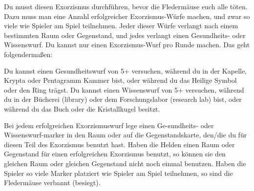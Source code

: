 





Du musst diesen Exorzismus durchführen, bevor die Fledermäuse euch alle töten. Dazu muss man eine Anzahl erfolgreicher Exorzismus-Würfe machen, und zwar so viele wie Spieler am Spiel teilnehmen. Jeder dieser Würfe verlangt nach einem bestimmten Raum oder Gegenstand, und jedes verlangt einen Gesundheits- oder Wissenswurf.
Du kannst nur einen Exorzismus-Wurf pro Runde machen. Das geht folgendermaßen:

  \begin{itemize}
    \bitem Du kannst einen Gesundheitswurf von 5+ versuchen, während du in der Kapelle, Krypta oder Pentagramm Kammer bist, oder während du das Heilige Symbol oder den Ring trägst.
    \bitem Du kannst einen Wissenswurf von 5+ versuchen, während du in der Bücherei (library) oder dem Forschungslabor (research lab) bist, oder während du das Buch oder die Kristallkugel besitzt.
    \end{itemize}

\newpage Bei jedem erfolgreichen Exorzismuswurf lege einen Ge-sundheits- oder Wissenswurf-marker in den Raum oder auf die Gegenstandskarte, den/die du für diesen Teil des Exorzismus benutzt hast.
Haben die Helden einen Raum oder Gegenstand für einen erfolgreichen Exorzismus benutzt, so können sie den gleichen Raum oder gleichen Gegenstand nicht noch einmal benutzen.
Haben die Spieler so viele Marker platziert wie Spieler am Spiel teilnehmen, so sind die Fledermäuse verbannt (besiegt).


